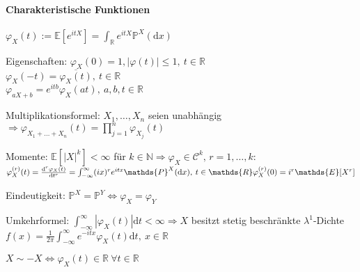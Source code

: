 \documentclass[a4paper,draft]{article}
\newcommand{\R}{\mathds{R}}
\newcommand{\N}{\mathds{N}}
\renewcommand{\P}{\mathds{P}}
\newcommand{\E}[1]{\mathds{E}[#1]}
\renewcommand{\d}{\mathrm{d}}
\newcommand{\parh}{\par\hangindent=0.5cm}
\begin{document}
\begin{multicols}{2}
\paragraph{Charakteristische Funktionen}\hspace{0pt}\parh
$\varphi_X(t) := \E{e^{itX}} = \int_\R e^{itX}\P^X(\d x)$\parh
Eigenschaften: $\varphi_X(0)=1,|\varphi(t)|\leq 1,\:t\in\R$\\
$\varphi_X(-t)=\overline{\varphi_X(t)},\: t\in\R$\\
$\varphi_{aX+b}=e^{itb}\varphi_X(at),\:a,b,t\in\R$\parh
Multiplikationsformel: $X_1,\dots,X_n$ seien unabhängig $\Longrightarrow \varphi_{X_1+\dots+X_n}(t)=\prod_{j=1}^n\varphi_{X_j}(t)$\parh
Momente: $\E{|X|^k}<\infty$ für $k\in\N \Rightarrow \varphi_X\in\mathcal{C}^k,\,r=1,\dots,k$:\\
$\varphi_X^{(r)}(t)=\frac{\d^r\varphi_X(t)}{\d t^r}=\int_{-\infty}^\infty (ix)^re^{itx}\P^X(\d x),\: t\in\R\\
\varphi_X^{(r)}(0)=i^r\E{X^r}$\parh
Eindeutigkeit: $\P^X=\P^Y \Longleftrightarrow \varphi_X=\varphi_Y$\parh
Umkehrformel: $\int_{-\infty}^\infty|\varphi_X(t)|\d t < \infty \Rightarrow X$ besitzt stetig beschränkte $\lambda^1$-Dichte\\
$f(x) = \frac{1}{2\pi}\int_{-\infty}^{\infty}e^{-itx}\varphi_X(t)\d t,\: x\in\R$\parh
$X\sim-X \Longleftrightarrow \varphi_X(t)\in\R \:\forall t\in\R$


\end{multicols}
\end{document}
